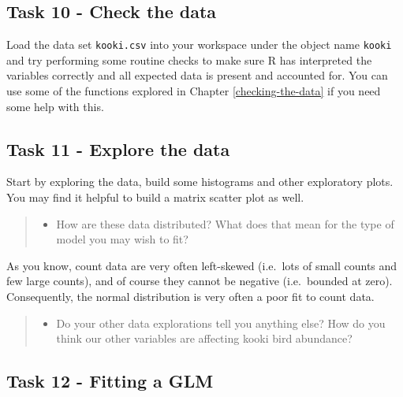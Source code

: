 \documentclass[
]{book}
\providecommand{\tightlist}{%
  \setlength{\itemsep}{0pt}\setlength{\parskip}{0pt}}
\begin{document}
\hypertarget{task-10---check-the-data}{%
\subsection{Task 10 - Check the data}\label{task-10---check-the-data}}

Load the data set \texttt{kooki.csv} into your workspace under the object name \texttt{kooki} and try performing some routine checks to make sure R has interpreted the variables correctly and all expected data is present and accounted for. You can use some of the functions explored in Chapter \ref{checking-the-data} if you need some help with this.

\hypertarget{task-11---explore-the-data}{%
\subsection{Task 11 - Explore the data}\label{task-11---explore-the-data}}

Start by exploring the data, build some histograms and other exploratory plots. You may find it helpful to build a matrix scatter plot as well.

\begin{quote}
\begin{itemize}
\tightlist
\item
  How are these data distributed? What does that mean for the type of model you may wish to fit?
\end{itemize}
\end{quote}

As you know, count data are very often left-skewed (i.e.~lots of small counts and few large counts), and of course they cannot be negative (i.e.~bounded at zero). Consequently, the normal distribution is very often a poor fit to count data.

\begin{quote}
\begin{itemize}
\tightlist
\item
  Do your other data explorations tell you anything else? How do you think our other variables are affecting kooki bird abundance?
\end{itemize}
\end{quote}

\hypertarget{task-12---fitting-a-glm}{%
\subsection{Task 12 - Fitting a GLM}\label{task-12---fitting-a-glm}}
\end{document}
